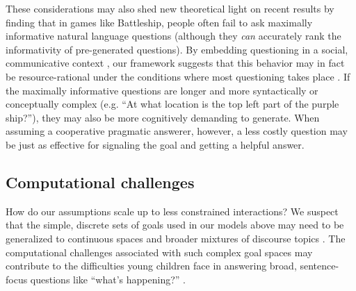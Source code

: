 \documentclass[11pt, floatsintext]{apa6}
\begin{document}
These considerations may also shed new theoretical light on recent results by  finding that in games like Battleship, people often fail to ask maximally informative natural language questions (although they \emph{can} accurately rank the informativity of pre-generated questions). 
By embedding questioning in a social, communicative context \cite<see also>{ShaftoGoodmanFrank12_LearningFromOthers, ShaftoGoodmanGriffiths14_Pedagogical}, our framework suggests that this behavior may in fact be resource-rational under the conditions where most questioning takes place \cite{GriffithsLiederGoodman15_LevelsOfAnalysis}.
If the maximally informative questions are longer and more syntactically or conceptually complex (e.g. ``At what location is the top left part of the purple ship?''), they may also be more cognitively demanding to generate.
When assuming a cooperative pragmatic answerer, however, a less costly question may be just as effective for signaling the goal and getting a helpful answer.

\subsection{Computational challenges}

How do our assumptions scale up to less constrained interactions? 
We suspect that the simple, discrete sets of goals used in our models above may need to be generalized to continuous spaces and broader mixtures of discourse topics \cite{BleiNgJordan03_LDA, GriffithsSteyversTenenbaum07_Topics}. 
The computational challenges associated with such complex goal spaces may contribute to the difficulties young children face in answering broad, sentence-focus questions like ``what's happening?'' \cite{SalomoLievenTomasello13_ChildrenAnsweringQuestions}. 
\end{document}
